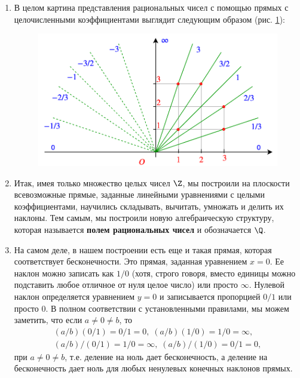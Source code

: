 \begin{enumerate}
\item В целом картина представления рациональных чисел с помощью прямых с целочисленными коэффициентами выглядит следующим образом (рис. \ref{ratio}):
\begin{figure}[htb!]
\begin{center}
\includegraphics[scale=0.4]{ratio.png}
\end{center}
\caption{}\label{ratio}
\end{figure}
\item Итак, имея только множество целых чисел $\Z$, мы построили на плоскости всевозможные прямые, заданные линейными уравнениями с целыми коэффициентами, научились складывать, вычитать, умножать и делить их наклоны. Тем самым, мы построили новую алгебраическую структуру, которая называется \textbf{полем рациональных чисел} и обозначается $\Q$.

\item На самом деле, в нашем построении есть еще и такая прямая, которая соответствует бесконечности. Это прямая, заданная уравнением $x=0$. Ее наклон можно записать как $1/0$ (хотя, строго говоря, вместо единицы можно подставить любое отличное от нуля целое число) или просто $\infty$. Нулевой наклон определяется уравнением $y=0$ и записывается пропорцией $0/1$ или просто $0$. В полном соответствии с установленными правилами, мы можем заметить, что если $a\ne 0 \ne b$, то
\begin{gather*}
(a/b)(0/1)=0/1=0,\;(a/b)(1/0)=1/0=\infty,\\ 
(a/b)/(0/1)=1/0=\infty,\;(a/b)/(1/0)=0/1=0,
\end{gather*}
при $a\ne 0\ne b$,
т.е. деление на ноль дает бесконечность, а деление на бесконечность дает ноль для любых ненулевых конечных наклонов прямых.


\end{enumerate}
